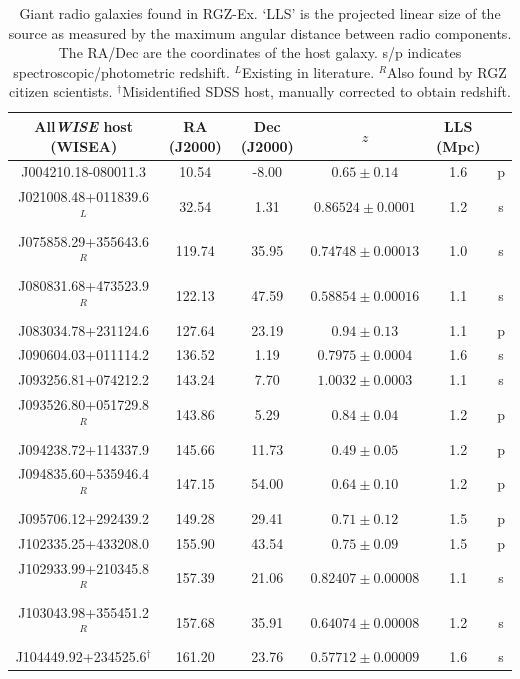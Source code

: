     \begin{table}
      \caption{\label{tab:grg} Giant radio galaxies found in RGZ-Ex. `LLS' is the projected linear size of the source as measured by the maximum angular distance between radio components. The RA/Dec are the coordinates of the host galaxy. s/p indicates spectroscopic/photometric redshift. ${}^L$Existing in literature. ${}^R$Also found by RGZ citizen scientists. ${}^\dagger$Misidentified SDSS host, manually corrected to obtain redshift.}
      \begin{footnotesize}\begin{tabular}{c|ccccc}
  \hline
  All\emph{WISE} host (WISEA) & RA (J2000) & Dec (J2000) & $z$ & LLS (Mpc) &\\
  \hline
    J004210.18-080011.3 & 10.54 & -8.00 & $0.65 \pm 0.14$ & 1.6 & p\\ %
    J021008.48+011839.6${}^L$ & 32.54 & 1.31 & $0.86524 \pm 0.0001$ & 1.2 & s\\ %
    J075858.29+355643.6${}^R$ & 119.74 & 35.95 & $0.74748 \pm 0.00013$ & 1.0 & s\\ %
    J080831.68+473523.9${}^R$ & 122.13 & 47.59 & $0.58854 \pm 0.00016$ & 1.1 & s\\ %
    J083034.78+231124.6 & 127.64 & 23.19 & $0.94 \pm 0.13$ & 1.1 & p\\ %
    J090604.03+011114.2 & 136.52 & 1.19 & $0.7975 \pm 0.0004$ & 1.6 & s\\ %
    J093256.81+074212.2 & 143.24 & 7.70 & $1.0032 \pm 0.0003$ & 1.1 & s\\ %
    J093526.80+051729.8${}^R$ & 143.86 & 5.29 & $0.84 \pm 0.04$ & 1.2 & p\\ %
    J094238.72+114337.9 & 145.66 & 11.73 & $0.49 \pm 0.05$ & 1.2 & p\\ %
    J094835.60+535946.4${}^R$ & 147.15 & 54.00 & $0.64 \pm 0.10$ & 1.2 & p\\ %
    J095706.12+292439.2 & 149.28 & 29.41 & $0.71 \pm 0.12$ & 1.5 & p\\ %
    J102335.25+433208.0 & 155.90 & 43.54 & $0.75 \pm 0.09$ & 1.5 & p\\ %
    J102933.99+210345.8${}^R$ & 157.39 & 21.06 & $0.82407 \pm 0.00008$ & 1.1 & s\\ %
    J103043.98+355451.2${}^R$ & 157.68 & 35.91 & $0.64074 \pm 0.00008$ & 1.2 & s\\ %
    J104449.92+234525.6${}^\dagger$ & 161.20 & 23.76 & $0.57712 \pm 0.00009$ & 1.6 & s\\ %

\end{tabular}
\end{footnotesize}
\end{table}

